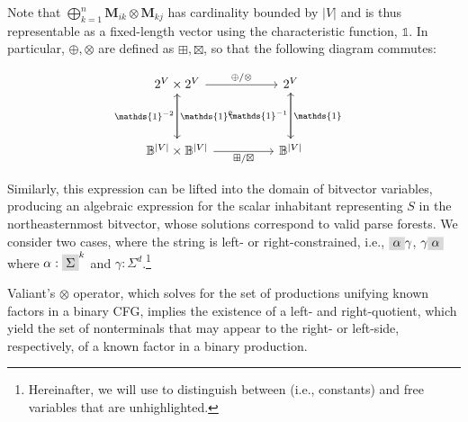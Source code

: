 \documentclass[sigplan,nonacm]{acmart}\settopmatter{printfolios=false,printccs=false,printacmref=false}
\begin{document}
  Note that $\bigoplus_{k = 1}^n \mathbf{M}_{ik} \otimes \mathbf{M}_{kj}$ has cardinality bounded by $|V|$ and is thus representable as a fixed-length vector using the characteristic function, $\mathds{1}$. In particular, $\oplus, \otimes$ are defined as $\boxplus, \boxtimes$, so that the following diagram commutes:\vspace{-10pt}

  \[\begin{tikzcd}[row sep=huge, column sep=huge]
      2^V \times 2^V \arrow[r, "\oplus/\otimes"] \arrow[d, "\mathds{1}^2"]
      & 2^V \arrow[d, "\mathds{1}\phantom{^{-1}}"] \\
      \mathbb{B}^{|V|} \times \mathbb{B}^{|V|} \arrow[r, "\boxplus/\boxtimes", labels=below] \arrow[u, "\mathds{1}^{-2}"]
      & \mathbb{B}^{|V|} \arrow[u, "\mathds{1}^{-1}"]
  \end{tikzcd}\]


  Similarly, this expression can be lifted into the domain of bitvector variables, producing an algebraic expression for the scalar inhabitant representing $S$ in the northeasternmost bitvector, whose solutions correspond to valid parse forests. We consider two cases, where the string is left- or right-constrained, i.e., $\highlight{\alpha}\gamma$, $\gamma\highlight{\alpha}$ where $\alpha: \highlight{\Sigma}^k$ and $\gamma: \Sigma^d$.\footnote{Hereinafter, we will use  to distinguish between  (i.e., constants) and free variables that are unhighlighted.}

  Valiant's $\otimes$ operator, which solves for the set of productions unifying known factors in a binary CFG, implies the existence of a left- and right-quotient, which yield the set of nonterminals that may appear to the right- or left-side, respectively, of a known factor in a binary production. %
\end{document}
